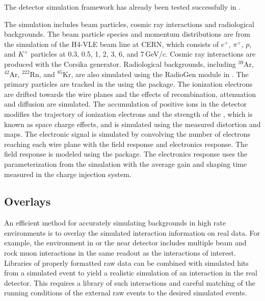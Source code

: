 \documentclass[../main-v1.tex]{subfiles}
\begin{document}
The detector simulation framework has already been tested successfully in . 

The  simulation includes beam particles, cosmic ray interactions and radiological backgrounds. The beam particle species and momentum distributions are from the  simulation of the H4-VLE beam line at CERN, which consists of $e^{+}$, $\pi^{+}$, $p$, and $K^{+}$ particles at 0.3, 0.5, 1, 2, 3, 6, and 7\,GeV/$c$. Cosmic ray interactions are produced with the Corsika generator. Radiological backgrounds, including $^{39}$Ar, $^{42}$Ar, $^{222}$Rn, and $^{85}$Kr, are also simulated using the RadioGen module in . The primary particles are tracked in the  using the  package. 
The ionization electrons are drifted towards the wire planes %
and the effects of recombination, attenuation and diffusion are simulated. The accumulation of positive ions in the detector modifies the trajectory of ionization electrons and the strength of the \efield, which is known as space charge effects, and is simulated using the measured distortion and \efield maps. The electronic signal is simulated by convolving the number of electrons reaching each wire plane with the field response and electronics response. The field response is modeled using the  package. 
 The electronics response uses the parameterization from the  simulation with the average gain and shaping time measured in the  charge injection system. 




\subsection{Overlays}
An efficient method for accurately simulating backgrounds in high rate environments is to overlay the simulated interaction information on real data.  For example, the environment in  or the near detector includes multiple beam and rock muon interactions in the same readout as %
the interactions of interest.  Libraries of properly formatted raw data can be combined with simulated hits from a simulated event to yield a realistic simulation of an interaction in the real detector. This requires a library of such interactions and careful matching of the running conditions of the external raw events to the desired simulated events. 
\end{document}
